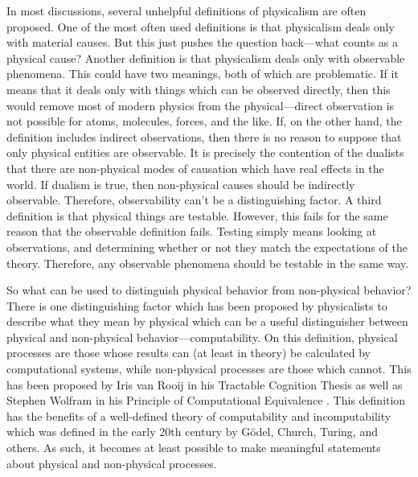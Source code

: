 In most discussions, several unhelpful definitions of physicalism are often proposed.  One of the most often used definitions is that physicalism deals only with material causes.  But this just pushes the question back---what counts as a physical cause?  Another definition is that physicalism deals only with observable phenomena.  This could have two meanings, both of which are problematic.  If it means that it deals only with things which can be observed directly, then this would remove most of modern physics from the physical---direct observation is not possible for atoms, molecules, forces, and the like.  If, on the other hand, the definition includes indirect observations, then there is no reason to suppose that only physical entities are observable.  It is precisely the contention of the dualists that there are non-physical modes of causation which have real effects in the world.  If dualism is true, then non-physical causes should be indirectly observable.  Therefore, observability can't be a distinguishing factor.  A third definition is that physical things are testable.  However, this fails for the same reason that the observable definition fails.  Testing simply means looking at observations, and determining whether or not they match the expectations of the theory.  Therefore, any observable phenomena should be testable in the same way.

So what can be used to distinguish physical behavior from non-physical behavior?  There is one distinguishing factor which has been proposed by physicalists to describe what they mean by physical which can be a useful distinguisher between physical and non-physical behavior---computability.  On this definition, physical processes are those whose results can (at least in theory) be calculated by computational systems, while non-physical processes are those which cannot.  This has been proposed by Iris van Rooij in his Tractable Cognition Thesis as well as Stephen Wolfram in his Principle of Computational Equivalence \citep{vanrooij2008, wolfram2002}.  This definition has the benefits of a well-defined theory of computability and incomputability which was defined in the early 20th century by G\"{o}del, Church, Turing, and others.  As such, it becomes at least possible to make meaningful statements about physical and non-physical processes.

